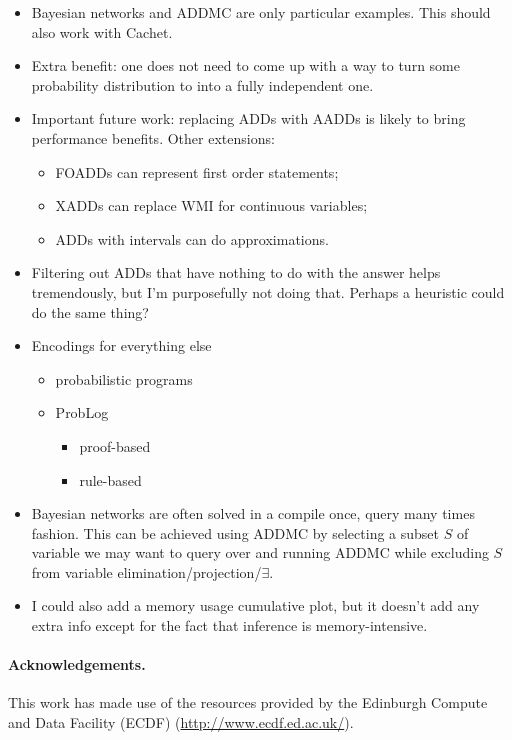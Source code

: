 \documentclass{article}
\theoremstyle{definition}
\theoremstyle{remark}
\begin{document}
\begin{itemize}
\item Bayesian networks and ADDMC are only particular examples. This should also
  work with Cachet.
\item Extra benefit: one does not need to come up with a way to turn some
  probability distribution to into a fully independent one.
\item Important future work: replacing ADDs with
  AADDs \cite{DBLP:conf/ijcai/SannerM05} is likely to bring performance
  benefits.
  Other extensions:
  \begin{itemize}
  \item FOADDs can represent first order statements;
  \item XADDs can replace WMI for continuous variables;
  \item ADDs with intervals can do approximations.
  \end{itemize}
\item Filtering out ADDs that have nothing to do with the answer helps
  tremendously, but I'm purposefully not doing that. Perhaps a heuristic could
  do the same thing?
\item Encodings for everything else
  \begin{itemize}
  \item probabilistic programs \cite{DBLP:journals/corr/abs-2005-09089}
  \item ProbLog \cite{DBLP:conf/uai/FierensBTGR11}
    \begin{itemize}
    \item proof-based \cite{DBLP:conf/iclp/MantadelisJ10}
    \item rule-based \cite{DBLP:conf/ecai/Janhunen04}
    \end{itemize}
  \end{itemize}
\item Bayesian networks are often solved in a compile once, query many times
  fashion. This can be achieved using ADDMC by selecting a subset $S$ of
  variable we may want to query over and running ADDMC while excluding $S$ from
  variable elimination/projection/$\exists$.
\item I could also add a memory usage cumulative plot, but it doesn't add any
  extra info except for the fact that inference is memory-intensive.
\end{itemize}

\paragraph{Acknowledgements.} This work has made use of the resources provided
by the Edinburgh Compute and Data Facility (ECDF)
(\url{http://www.ecdf.ed.ac.uk/}).



\end{document}
